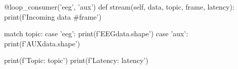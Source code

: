 \begin{python}
@loop_consumer('eeg', 'aux')
def stream(self, data, topic, frame, latency):
    print(f'Incoming data #{frame}')
    
    match topic:
        case 'eeg':
            print(f'EEG{data.shape}')
        case 'aux':
            print(f'AUX{data.shape}')
    
    print(f'Topic: {topic}')
    print(f'Latency: {latency}')
\end{python}